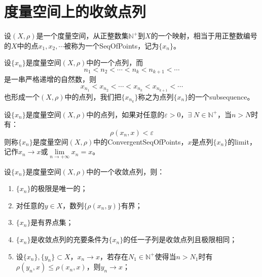 \section{度量空间上的收敛点列}
\begin{definition}
	设$(X,\rho)$是一个度量空间，从正整数集$\mathbb{N}^+$到$X$的一个映射，相当于用正整数编号的$X$中的点$x_1,x_2,\cdots$被称为一个\gls{SeqOfPoints}，记为$\{x_n\}$。
\end{definition}
\begin{definition}
	设$\{x_n\}$是度量空间$(X,\rho)$中的一个点列，而
	\begin{equation*}
		n_1<n_2<\cdots<n_k<n_{k+1}<\cdots
	\end{equation*}
	是一串严格递增的自然数，则
	\begin{equation*}
		x_{n_1}<x_{n_2}<\cdots<x_{n_k}<x_{n_{k+1}}<\cdots
	\end{equation*}
	也形成一个$(X,\rho)$中的点列，我们把$\{x_{n_k}\}$称之为点列$\{x_n\}$的一个\gls{subsequence}。
\end{definition}
\begin{definition}
	设$\{x_n\}$是度量空间$(X,\rho)$中的点列，如果对任意的$\varepsilon>0$，$\exists\; N\in\mathbb{N}^+$，当$n>N$时有：
	\begin{equation*}
		\rho(x_n,x)<\varepsilon
	\end{equation*}
	则称$\{x_n\}$是度量空间$(X,\rho)$中的\gls{ConvergentSeqOfPoints}，$x$是点列$\{x_n\}$的\gls{limit}，记作$x_n\to x$或$\lim\limits_{n\to+\infty}x_n=x$。
\end{definition}
\begin{property}
	设$\{x_n\}$是度量空间$(X,\rho)$中的一个收敛点列，则：
	\begin{enumerate}
		\item $\{x_n\}$的极限是唯一的；
		\item 对任意的$ y\in X$，数列$\{\rho(x_n,y)\}$有界；
		\item $\{x_n\}$是有界点集；
		\item $\{x_n\}$是收敛点列的充要条件为$\{x_n\}$的任一子列是收敛点列且极限相同；
		\item 设$\{x_n\},\{y_n\}\subset X$，$x_n\to x$，若存在$N_1\in\mathbb{N}^+$使得当$n>N_1$时有$\rho(y_n,x)\leqslant\rho(x_n,x)$，则$y_n\to x$；
	\end{enumerate}
\end{property}
